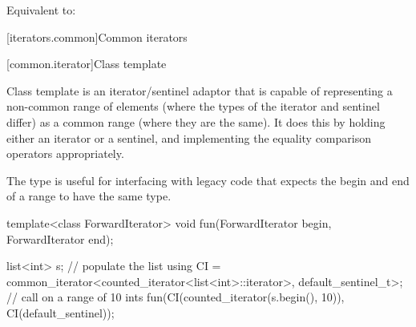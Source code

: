 \begin{itemdescr}
\pnum
\effects Equivalent to: 
\end{itemdescr}

[iterators.common]{Common iterators}

[common.iterator]{Class template }

\pnum
Class template  is an iterator/sentinel adaptor that is
capable of representing a non-common range of elements (where the types of the
iterator and sentinel differ) as a common range (where they are the same). It
does this by holding either an iterator or a sentinel, and implementing the
equality comparison operators appropriately.

\pnum
\begin{note}
The  type is useful for interfacing with legacy
code that expects the begin and end of a range to have the same type.
\end{note}

\pnum
\begin{example}
\begin{codeblock}
template<class ForwardIterator>
void fun(ForwardIterator begin, ForwardIterator end);

list<int> s;
// populate the list 
using CI = common_iterator<counted_iterator<list<int>::iterator>, default_sentinel_t>;
// call  on a range of 10 ints
fun(CI(counted_iterator(s.begin(), 10)), CI(default_sentinel));
\end{codeblock}
\end{example}

